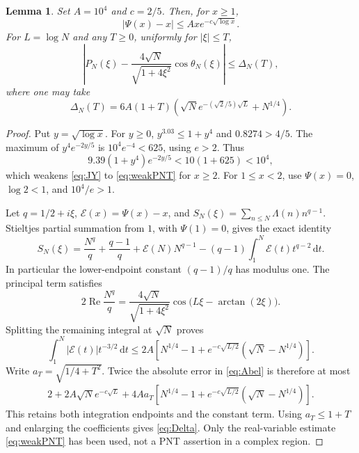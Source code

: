 \documentclass[11pt]{article}
\newtheorem{lemma}[theorem]{Lemma}
\theoremstyle{remark}\newtheorem{remark}[theorem]{Remark}
\newcommand{\dd}{\,\mathrm d}
\numberwithin{equation}{section}
\begin{document}
\begin{lemma}\label{lem:PNT}
Set $A=10^4$ and $c=2/5$. Then, for $x\ge1$,
\begin{equation}\label{eq:weakPNT}
 |\Psi(x)-x|\le Axe^{-c\sqrt{\log x}}.
\end{equation}
For $L=\log N$ and any $T\ge0$, uniformly for $|\xi|\le T$,
\begin{equation}\label{eq:primeapprox}
 \left|P_N(\xi)-\frac{4\sqrt N}{\sqrt{1+4\xi^2}}
        \cos\theta_N(\xi)\right|\le\Delta_N(T),
\end{equation}
where one may take
\begin{equation}\label{eq:Delta}
 \Delta_N(T)=6A(1+T)
 \left(\sqrt N e^{-(\sqrt2/5)\sqrt L}+N^{1/4}\right).
\end{equation}
\end{lemma}
\begin{proof}
Put $y=\sqrt{\log x}$. For $y\ge0$, $y^{3.03}\le1+y^4$ and $0.8274>4/5$. The maximum of $y^4e^{-2y/5}$ is $10^4e^{-4}<625$, using $e>2$. Thus
\[
 9.39(1+y^4)e^{-2y/5}<10(1+625)<10^4,
\]
which weakens \eqref{eq:JY} to \eqref{eq:weakPNT} for $x\ge2$. For $1\le x<2$, use $\Psi(x)=0$, $\log2<1$, and $10^4/e>1$.

Let $q=1/2+i\xi$, $\mathcal E(x)=\Psi(x)-x$, and
$S_N(\xi)=\sum_{n\le N}\Lambda(n)n^{q-1}$.
Stieltjes partial summation from $1$, with $\Psi(1)=0$, gives the exact identity
\begin{equation}\label{eq:Abel}
 S_N(\xi)=\frac{N^q}{q}+\frac{q-1}{q}
 +\mathcal E(N)N^{q-1}
 -(q-1)\int_1^N\mathcal E(t)t^{q-2}\dd t.
\end{equation}
In particular the lower-endpoint constant $(q-1)/q$ has modulus one. The principal term satisfies
\[
 2\operatorname{Re}\frac{N^q}{q}
 =\frac{4\sqrt N}{\sqrt{1+4\xi^2}}
   \cos\bigl(L\xi-\arctan(2\xi)\bigr).
\]
Splitting the remaining integral at $\sqrt N$ proves
\begin{equation}\label{eq:integraltransfer}
 \int_1^N|\mathcal E(t)|t^{-3/2}\dd t
 \le2A\left[N^{1/4}-1+
 e^{-c\sqrt{L/2}}(\sqrt N-N^{1/4})\right].
\end{equation}
Write $a_T=\sqrt{1/4+T^2}$. Twice the absolute error in \eqref{eq:Abel} is therefore at most
\begin{equation}\label{eq:allendpoints}
 \begin{split}
 2+2A\sqrt N e^{-c\sqrt L}
 +4Aa_T\left[N^{1/4}-1+
 e^{-c\sqrt{L/2}}(\sqrt N-N^{1/4})\right].
 \end{split}
\end{equation}
This retains both integration endpoints and the constant term. Using $a_T\le1+T$ and enlarging the coefficients gives \eqref{eq:Delta}. Only the real-variable estimate \eqref{eq:weakPNT} has been used, not a PNT assertion in a complex region.
\end{proof}
\end{document}

